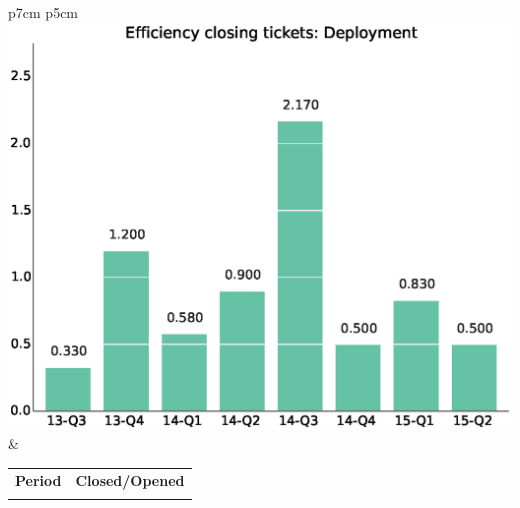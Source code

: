 \documentclass[a4wide,11pt]{article}
\begin{document}


\begin{tabular}{p{7cm} p{5cm}}
    \vspace{0pt} 
    \includegraphics[scale=.35]{figs/bmiDeployment.eps}
    & 
    \vspace{0pt}
    \begin{tabular}{l|l}%
    \bfseries Period & \bfseries Closed/Opened %
    \csvreader[head to column names]{data/bmiDeployment.csv}{}%
    {\\ & \bmi}
    \end{tabular}
\end{tabular}
\end{document}
